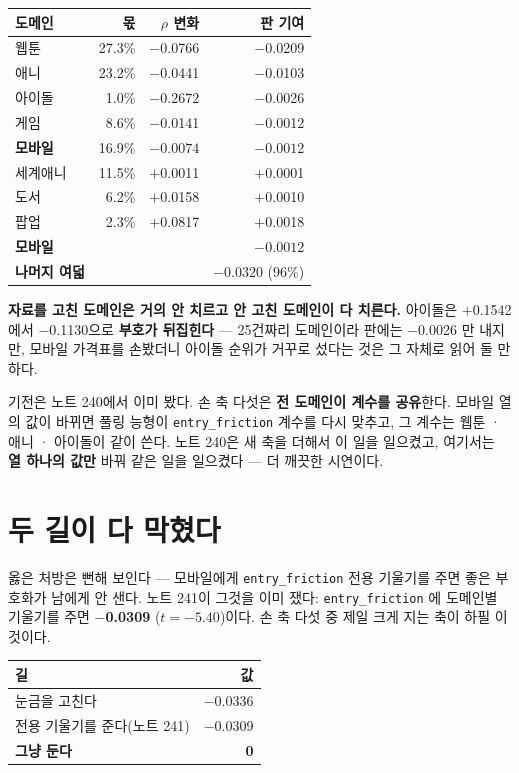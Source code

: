 \documentclass[10pt]{article}
\begin{document}
\begin{center}\small
\begin{tabular}{lrrr}
\hline
도메인 & 몫 & $\rho$ 변화 & 판 기여 \\
\hline
웹툰 & 27.3\% & $-$0.0766 & $-$0.0209 \\
애니 & 23.2\% & $-$0.0441 & $-$0.0103 \\
아이돌 & 1.0\% & $\mathbf{-0.2672}$ & $-$0.0026 \\
게임 & 8.6\% & $-$0.0141 & $-$0.0012 \\
\textbf{모바일} & 16.9\% & $\mathbf{-0.0074}$ & $\mathbf{-0.0012}$ \\
세계애니 & 11.5\% & $+$0.0011 & $+$0.0001 \\
도서 & 6.2\% & $+$0.0158 & $+$0.0010 \\
팝업 & 2.3\% & $+$0.0817 & $+$0.0018 \\
\hline
\textbf{모바일} & & & $\mathbf{-0.0012}$ \\
\textbf{나머지 여덟} & & & $\mathbf{-0.0320}$ (96\%) \\
\hline
\end{tabular}
\end{center}

\textbf{자료를 고친 도메인은 거의 안 치르고 안 고친 도메인이 다 치른다.}
아이돌은 $+$0.1542에서 $-$0.1130으로 \textbf{부호가 뒤집힌다} --- 25건짜리
도메인이라 판에는 $-$0.0026 만 내지만, 모바일 가격표를 손봤더니 아이돌
순위가 거꾸로 섰다는 것은 그 자체로 읽어 둘 만하다.

기전은 노트 240에서 이미 봤다. 손 축 다섯은 \textbf{전 도메인이 계수를
공유}한다. 모바일 열의 값이 바뀌면 풀링 능형이 \texttt{entry\_friction}
계수를 다시 맞추고, 그 계수는 웹툰 · 애니 · 아이돌이 같이 쓴다. 노트 240은
새 축을 더해서 이 일을 일으켰고, 여기서는 \textbf{열 하나의 값만} 바꿔
같은 일을 일으켰다 --- 더 깨끗한 시연이다.

\section{두 길이 다 막혔다}

옳은 처방은 뻔해 보인다 --- 모바일에게 \texttt{entry\_friction} 전용
기울기를 주면 좋은 부호화가 남에게 안 샌다. 노트 241이 그것을 이미 쟀다:
\texttt{entry\_friction} 에 도메인별 기울기를 주면 \textbf{$-$0.0309}
($t{=}-5.40$)이다. 손 축 다섯 중 제일 크게 지는 축이 하필 이것이다.

\begin{center}\small
\begin{tabular}{lr}
\hline
길 & 값 \\
\hline
눈금을 고친다 & $-$0.0336 \\
전용 기울기를 준다(노트 241) & $-$0.0309 \\
\textbf{그냥 둔다} & \textbf{0} \\
\hline
\end{tabular}
\end{center}
\end{document}
